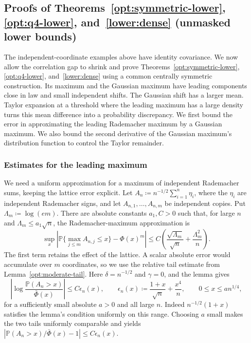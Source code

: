 \documentclass[11pt,letterpaper]{article}
\theoremstyle{remark}
\newcommand{\Pp}{\mathbb P}
\begin{document}
\subsection{Proofs of Theorems~\ref*{opt:symmetric-lower}, \ref*{opt:q4-lower}, and~\ref*{lower:dense} (unmasked lower bounds)}
\label{app:symmetric-lower}
The independent-coordinate examples above have identity covariance. We now allow the
correlation gap to shrink and prove Theorems~\ref{opt:symmetric-lower},
\ref{opt:q4-lower}, and~\ref{lower:dense} using a common centrally symmetric construction. Its maximum and the Gaussian
maximum have leading components close in law and small independent
shifts. The Gaussian shift has a larger mean. Taylor expansion at a threshold
where the leading maximum has a large density turns this mean difference
into a probability discrepancy. We first bound the error in approximating the leading Rademacher
maximum by a Gaussian maximum. We also bound the second derivative
of the Gaussian maximum's distribution function to control the Taylor
remainder.

\subsubsection{Estimates for the leading maximum}

We need a uniform approximation for a maximum of independent
Rademacher sums, keeping the lattice error explicit. Let
\(A_n\coloneqq n^{-1/2}\sum_{i=1}^n\eta_i\), where the
\(\eta_i\) are independent Rademacher signs, and let
\(A_{n,1},\ldots,A_{n,m}\) be independent copies. Put
\(\Lambda_m\coloneqq\log(em)\). There are absolute constants
\(a_1,C>0\) such that, for large \(n\) and
\(\Lambda_m\le a_1\sqrt n\), the Rademacher-maximum approximation is
\begin{equation}
 \sup_x\left|\Pp\{\max_{j\le m}A_{n,j}\le x\}-\Phi(x)^m\right|
 \le C\left(\frac{\sqrt{\Lambda_m}}{\sqrt n}
                 +\frac{\Lambda_m^2}{n}\right).
 \label{sym:eq:rademacher-max}
\end{equation}
The first term retains the effect of the lattice. A scalar absolute
error would accumulate over \(m\) coordinates, so we use the relative
tail estimate from Lemma~\ref{opt:moderate-tail}. Here
\(\delta=n^{-1/2}\) and \(\gamma=0\), and the lemma gives
\[
 \left|\log\frac{\Pp(A_n>x)}{\bar\Phi(x)}\right|
 \le C\epsilon_n(x),\qquad
 \epsilon_n(x)\coloneqq\frac{1+x}{\sqrt n}+\frac{x^4}{n},
 \qquad 0\le x\le an^{1/4},
\]
for a sufficiently small absolute \(a>0\) and all large \(n\).
Indeed \(n^{-1/2}(1+x)\) satisfies the lemma's condition uniformly
on this range. Choosing \(a\) small makes the two tails uniformly
comparable and yields
\(\left|\Pp(A_n>x)/\bar\Phi(x)-1\right|\le C\epsilon_n(x)\).
\end{document}
